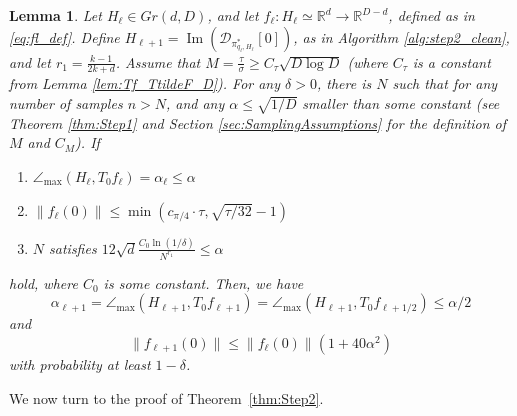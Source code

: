 \documentclass[12pt]{article}
\newtheorem{Lemma}[Theorem]{Lemma}
\theoremstyle{remark}
\newcommand{\RR}{\mathbb{R}}
\newcommand{\DD}{\mathcal{D}}
\newcommand{\maxangle}{\angle_{\max}}
\newcommand{\stau}{\tau}
\newcommand{\sM}{{M}}
\DeclareMathOperator{\Ima}{Im}
\begin{document}
\begin{Lemma} \label{lem:main_support_theorem_step2}
	Let $H_\ell\in Gr(d, D)$, and let $f_\ell:H_\ell\simeq\RR^d \rightarrow \RR^{D-d}$, defined as in \eqref{eq:fl_def}. Define $H_{\ell+1} = \Ima(\DD_{\pi^*_{q_\ell,H_{\ell}}}[0])$, as in Algorithm \ref{alg:step2_clean}, and let $r_1 = \frac{k-1}{2k +d}$. 
	Assume that $M = \frac{\tau}{\sigma} \geq C_\stau \sqrt{D\log D}$ (where $C_\stau$ is a constant from Lemma \ref{lem:Tf_TtildeF_D}).
	For any $\delta>0$, there is $N$ such that for any number of samples $n>N$, and any $\alpha \leq\sqrt{1/D}$ smaller than some constant \emph{(}see Theorem \ref{thm:Step1} and Section \ref{sec:SamplingAssumptions} for the definition of $M$ and $C_\sM$\emph{)}.  If
	\begin{enumerate}
		\item $\maxangle (H_\ell, T_0 f_\ell) = \alpha_\ell\leq \alpha$
		\item $\|f_\ell(0)\| \leq \min (c_{\pi/4} \cdot \tau, \sqrt{\tau/32} -1) $
		\item $N$ satisfies $ 12\sqrt{d} \frac{C_0 \ln(1/\delta)}{N^{r_1}}\leq \alpha $ 
	\end{enumerate}
	hold, where $C_0$ is some constant. Then, we have  
	\[
	\alpha_{\ell+1} = \maxangle (H_{\ell+1}, T_0 f_{\ell+1})  = \maxangle (H_{\ell+1}, T_0 f_{\ell+1/2}) \leq \alpha/2
	\]
	and
	\[
	\|f_{\ell+1}(0)\| \leq \|f_\ell(0)\|\left(1+40\alpha^2\right) 
	\]
	with probability at least $1-\delta$.
\end{Lemma}
We now turn to the proof of Theorem~\ref{thm:Step2}.
\end{document}
